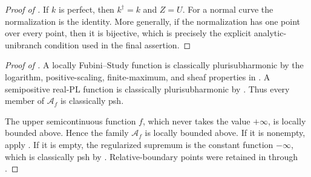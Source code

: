 \begin{proof}[Proof of
]
If \(k\) is perfect, then \(k^\dagger=k\) and \(Z=U\).  For a normal
curve the normalization is the identity.  More generally, if the
normalization has one point over every point, then it is bijective, which
is precisely the explicit analytic-unibranch condition used in the final
assertion.
\end{proof}

\begin{proof}[Proof of
]
A locally Fubini--Study function is classically plurisubharmonic by the
logarithm, positive-scaling, finite-maximum, and sheaf properties in
\cite[Proposition~4.2(1)--(3)]{GR25Classical}.  A semipositive real-PL
function is classically plurisubharmonic by
\cite[Theorem~4.3]{GR25Classical}.  Thus every member of
\(\mathcal A_f\) is classically psh.

The upper semicontinuous function \(f\), which never takes the value
\(+\infty\), is locally bounded above.  Hence the family
\(\mathcal A_f\) is locally bounded above.  If it is nonempty, apply
.  If it is empty, the
regularized supremum is the constant function \(-\infty\), which is
classically psh by \cite[Definitions~3.4 and~4.1]{GR25Classical}.
Relative-boundary points were retained in
 through
\cite[Proposition~3.5(3)]{GR25Classical}.
\end{proof}
